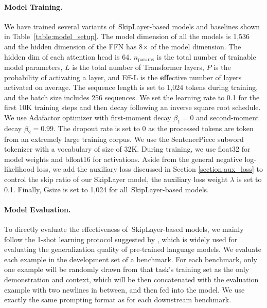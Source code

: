\documentclass{article}
\newcommand{\skipl}{SkipLayer\xspace}
\begin{document}
\paragraph{Model Training.}
We have trained several variants of~\skipl-based models and baselines shown in Table~\ref{table:model_setup}. The model dimension of all the models is 1,536 and the hidden dimension of the FFN has 8$\times$ of the model dimension. The hidden dim of each attention head is 64. $n_{\text{params}}$ is the total number of trainable model parameters, $L$ is the total number of Transformer layers, $P$ is the probability of activating a layer, and Eff-L is the {\textbf{eff}}ective number of layers activated on average.
%
The sequence length is set to 1,024 tokens during training, and the batch size includes 256 sequences.
We set the learning rate to 0.1 for the first 10K training steps and then decay following an inverse square root schedule.
We use Adafactor optimizer with first-moment decay
$\beta_1 = 0$ and second-moment decay $\beta_2 = 0.99$.
The dropout rate is set to 0 as the processed tokens are token from an extremely large training corpus.
We use the SentencePiece \cite{Kudo2018SentencePieceAS} subword tokenizer with a vocabulary of size of 32K. 
During training, we use float32 for model weights and bfloat16 for activations.
Aside from the general negative log-likelihood loss, we add the auxiliary loss discussed in Section \ref{section:aux_loss} to control the skip ratio of our SkipLayer model, the auxiliary loss weight $\lambda$ is set to 0.1.
Finally, Gsize is set to 1,024 for all~\skipl-based models.

\paragraph{Model Evaluation.}
To directly evaluate the effectiveness of~\skipl-based models, we mainly follow the 1-shot learning protocol suggested by \cite{radford2019language}, which is widely used for evaluating the generalization quality of pre-trained language models. We evaluate each example in the development set of a benchmark. For each benchmark, only one example will be randomly drawn from that task's training set as the only demonstration and context, which will be then concatenated with the evaluation example with two newlines in between, and then fed into the model. We use exactly the same prompting format as \cite{radford2019language} for each downstream benchmark.
\end{document}
